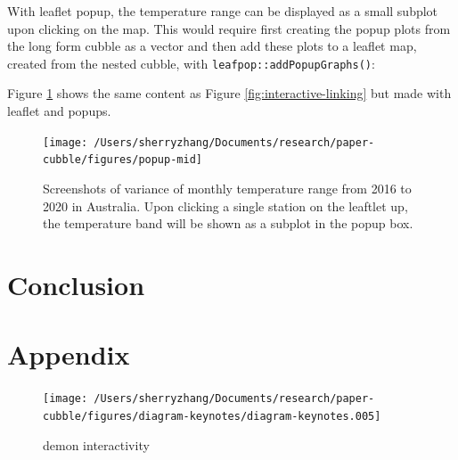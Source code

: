 \documentclass[
]{jss}
\begin{document}
With leaflet popup, the temperature range can be displayed as a small
subplot upon clicking on the map. This would require first creating the
popup plots from the long form cubble as a vector and then add these
plots to a leaflet map, created from the nested cubble, with
\texttt{leafpop::addPopupGraphs()}:

\begin{CodeChunk}
\end{CodeChunk}

Figure \ref{fig:interactive-popup} shows the same content as Figure
\ref{fig:interactive-linking} but made with leaflet and popups.

\begin{CodeChunk}
\begin{figure}

{\centering \texttt{[image: /Users/sherryzhang/Documents/research/paper-cubble/figures/popup-mid]} 

}

\caption[Screenshots of variance of monthly temperature range from 2016 to 2020 in Australia]{Screenshots of variance of monthly temperature range from 2016 to 2020 in Australia. Upon clicking a single station on the leaftlet up, the temperature band will be shown as a subplot in the popup box.}\label{fig:interactive-popup}
\end{figure}
\end{CodeChunk}

\hypertarget{conclusion}{%
\section{Conclusion}\label{conclusion}}

\hypertarget{appendix}{%
\section{Appendix}\label{appendix}}

\begin{CodeChunk}
\begin{figure}

{\centering \texttt{[image: /Users/sherryzhang/Documents/research/paper-cubble/figures/diagram-keynotes/diagram-keynotes.005]} 

}

\caption[demon interactivity]{demon interactivity}\label{fig:illu-interactive-2}
\end{figure}
\end{CodeChunk}


\end{document}
